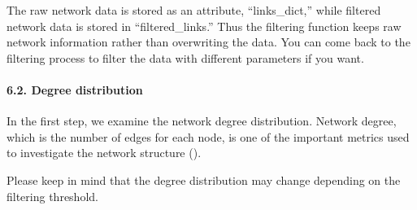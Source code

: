 \documentclass[letterpaper,10pt,english]{sphinxmanual}
\begin{document}
The raw network data is stored as an attribute, “links\_dict,” while filtered network data is stored in “filtered\_links.” Thus the filtering function keeps raw network information rather than overwriting the data. You can come back to the filtering process to filter the data with different parameters if you want.

{
\begin{sphinxVerbatim}[commandchars=\\\{\}]
\llap{\color{nbsphinxin}[78]:\,\hspace{\fboxrule}\hspace{\fboxsep}}  
\end{sphinxVerbatim}
}


\paragraph{6.2. Degree distribution}
\label{\detokenize{notebooks/04_Network_analysis/Network_analysis_with_Paul_etal_2015_data:6.2.-Degree-distribution}}
In the first step, we examine the network degree distribution. Network degree, which is the number of edges for each node, is one of the important metrics used to investigate the network structure ().

Please keep in mind that the degree distribution may change depending on the filtering threshold.

{
\begin{sphinxVerbatim}[commandchars=\\\{\}]
\llap{\color{nbsphinxin}[79]:\,\hspace{\fboxrule}\hspace{\fboxsep}}\PYG{p}{[}\PYG{p}{]}  \PYG{p}{[} \PYG{p}{]}
\end{sphinxVerbatim}
}
\end{document}
